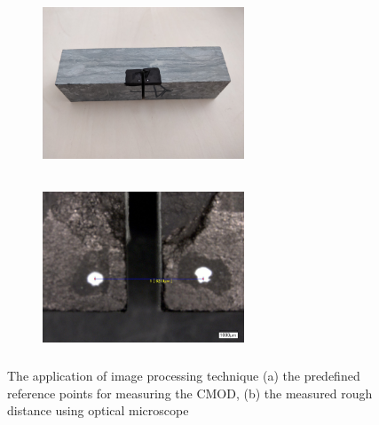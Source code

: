 \begin{figure}[!ht]
\centering
\begin{subfigure}[c]{0.48\textwidth}
\centering
\includegraphics[width=6cm,height=5cm]{figures/Amir_Fracture_Toughness_Image_a.png}
\subcaption{}
\label{fig:Amir_Fracture_Toughness_Image_a}
\end{subfigure}
\hfill
\begin{subfigure}[c]{0.48\textwidth}
\centering
\includegraphics[width=6cm,height=5cm]{figures/Amir_Fracture_Toughness_Image_b.png}
\subcaption{}
\label{fig:Amir_Fracture_Toughness_Image_b}
\end{subfigure}
\caption{The application of image processing technique (a) the predefined reference points for measuring the CMOD, (b) the measured rough distance using optical microscope}
\end{figure}